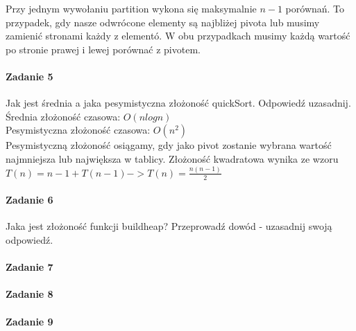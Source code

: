 \documentclass[18pt]{extarticle}
\begin{document}
Przy jednym wywołaniu partition wykona się maksymalnie $n-1$ porównań. To przypadek, gdy nasze odwrócone elementy są najbliżej pivota lub musimy zamienić stronami każdy z elementó. W obu przypadkach musimy każdą wartość po stronie prawej i lewej porównać z pivotem.

\paragraph{Zadanie 5} Jak jest średnia a jaka pesymistyczna złożoność quickSort. Odpowiedź uzasadnij. \\


Średnia złożoność czasowa: $O(nlogn)$ \\
Pesymistyczna złożoność czasowa: $O(n^2)$ \\
Pesymistyczną złożoność osiągamy, gdy jako pivot zostanie wybrana wartość najmniejsza lub największa w tablicy. Złożoność kwadratowa wynika ze wzoru \\
$T(n) = n - 1 + T(n-1) -> T(n)=\frac{n(n-1)}{2}$

\paragraph{Zadanie 6} Jaka jest złożoność funkcji buildheap? Przeprowadź dowód - uzasadnij swoją odpowiedź.

\paragraph{Zadanie 7} 

\paragraph{Zadanie 8} 

\paragraph{Zadanie 9} 
\end{document}
